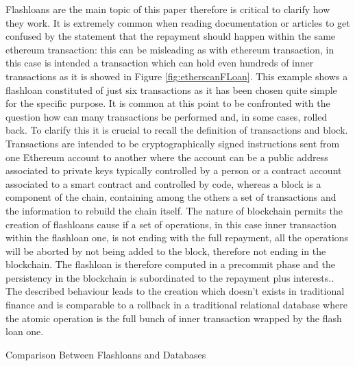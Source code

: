 \documentclass[11pt,a4paper,titlepage]{scrartcl}
\begin{document}
Flashloans are the main topic of this paper therefore is critical to clarify how they work. It is extremely common when reading documentation or articles to get confused by the statement that the repayment should happen within the same ethereum transaction: this can be misleading as with ethereum transaction, in this case is intended a transaction which can hold even hundreds of inner transactions as it is showed in Figure \ref{fig:etherscanFLoan}. This example shows a flashloan constituted of just six transactions as it has been chosen quite simple for the specific purpose.
It is common at this point to be confronted with the question how can many transactions be performed and, in some cases, rolled back.
To clarify this  it is crucial to recall the definition of transactions and block. Transactions are intended to be cryptographically signed instructions sent from one Ethereum account to another where the account can be a public address associated to private keys typically controlled by a person or a contract account associated to a smart contract and controlled by code, whereas a  block  is a component of the chain, containing among the others a set of transactions and the information to rebuild the chain itself. The nature of blockchain permits the creation of flashloans cause if a set of operations, in this case inner transaction within the flashloan one, is not ending with the full repayment, all the operations will be aborted by not being added to the block, therefore not ending in the blockchain. The flashloan is therefore computed in a precommit phase and the persistency in the blockchain is subordinated to the repayment plus interests.. The described behaviour leads to the creation which doesn't exists in traditional finance and is comparable to a rollback in a traditional relational database where the atomic operation is the full bunch of inner transaction wrapped by the flash loan one. 

\begin{table}[ht]
\centering
\caption{Comparison Between Flashloans and Databases}
\caption*{\footnotesize Flashloans have no counterpart in traditional finance. The best fit for a comparison is a transactional process in traditional databases.}
\label{tab:flashloans_vs_db}
\end{table}
\end{document}
